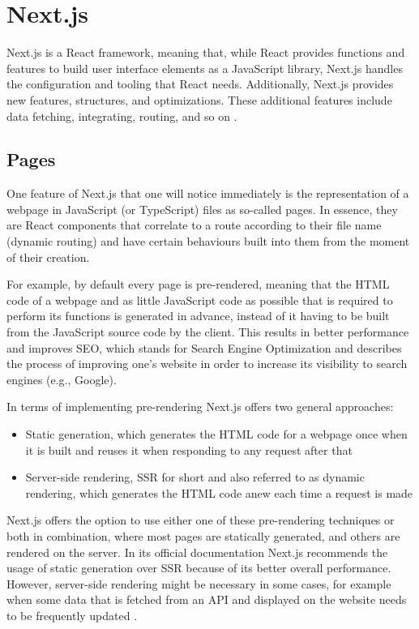 \section{Next.js}
Next.js is a React framework, meaning that, while React provides functions and features to build user interface elements
as a JavaScript library, Next.js handles the configuration and tooling that React needs. Additionally, Next.js provides
new features, structures, and optimizations. These additional features include data fetching, integrating, routing,
and so on \cite{NextjsDescription}.
\\
\subsection{Pages}
One feature of Next.js that one will notice immediately is the representation of a webpage in JavaScript (or TypeScript) files as
so-called pages. In essence, they are React components that correlate to a route according to their file name (dynamic routing) and
have certain behaviours built into them from the moment of their creation.

For example, by default every page is pre-rendered, meaning that the HTML code of a webpage and as little JavaScript code as possible
that is required to perform its functions is generated in advance, instead of it having to be built from the JavaScript source code by
the client. This results in better performance and improves SEO, which stands for Search Engine Optimization and describes the process
of improving one's website in order to increase its visibility to search engines (e.g., Google).

In terms of implementing pre-rendering Next.js offers two general approaches: 
\begin{itemize}
  \item Static generation, which generates the HTML code for a webpage once when it is built and reuses it when responding to any request after that
  \item Server-side rendering, SSR for short and also referred to as dynamic rendering, which generates the HTML code anew each time a request is made
\end{itemize}

Next.js offers the option to use either one of these pre-rendering
techniques or both in combination, where most pages are statically generated, and others are rendered on the server. In its official
documentation Next.js recommends the usage of static generation over SSR because of its better overall performance. However, server-side
rendering might be necessary in some cases, for example when some data that is fetched from an API and displayed on the website needs
to be frequently updated \cite{NextjsPages}.
\\
